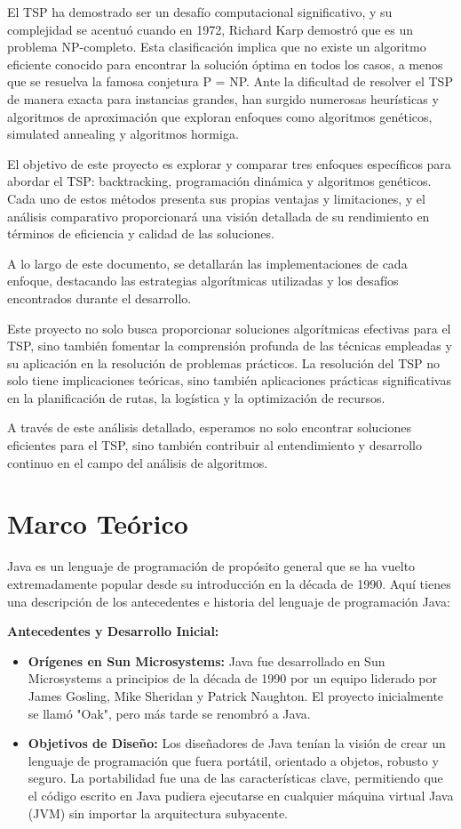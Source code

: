 \documentclass{article}
\begin{document}
	El TSP ha demostrado ser un desafío computacional significativo, y su complejidad se acentuó cuando en 1972, Richard Karp demostró que es un problema NP-completo. Esta clasificación implica que no existe un algoritmo eficiente conocido para encontrar la solución óptima en todos los casos, a menos que se resuelva la famosa conjetura P = NP. Ante la dificultad de resolver el TSP de manera exacta para instancias grandes, han surgido numerosas heurísticas y algoritmos de aproximación que exploran enfoques como algoritmos genéticos, simulated annealing y algoritmos hormiga.
	
	El objetivo de este proyecto es explorar y comparar tres enfoques específicos para abordar el TSP: backtracking, programación dinámica y algoritmos genéticos. Cada uno de estos métodos presenta sus propias ventajas y limitaciones, y el análisis comparativo proporcionará una visión detallada de su rendimiento en términos de eficiencia y calidad de las soluciones.
	
	A lo largo de este documento, se detallarán las implementaciones de cada enfoque, destacando las estrategias algorítmicas utilizadas y los desafíos encontrados durante el desarrollo. 
	
	Este proyecto no solo busca proporcionar soluciones algorítmicas efectivas para el TSP, sino también fomentar la comprensión profunda de las técnicas empleadas y su aplicación en la resolución de problemas prácticos. La resolución del TSP no solo tiene implicaciones teóricas, sino también aplicaciones prácticas significativas en la planificación de rutas, la logística y la optimización de recursos.
	
	A través de este análisis detallado, esperamos no solo encontrar soluciones eficientes para el TSP, sino también contribuir al entendimiento y desarrollo continuo en el campo del análisis de algoritmos.
	
	\section{Marco Teórico}
	Java es un lenguaje de programación de propósito general que se ha vuelto extremadamente popular desde su introducción en la década de 1990. Aquí tienes una descripción de los antecedentes e historia del lenguaje de programación Java:
	
	\textbf{Antecedentes y Desarrollo Inicial:}
	\begin{itemize}
		\item \textbf{Orígenes en Sun Microsystems:} Java fue desarrollado en Sun Microsystems a principios de la década de 1990 por un equipo liderado por James Gosling, Mike Sheridan y Patrick Naughton. El proyecto inicialmente se llamó "Oak", pero más tarde se renombró a Java.
		
		\item \textbf{Objetivos de Diseño:} Los diseñadores de Java tenían la visión de crear un lenguaje de programación que fuera portátil, orientado a objetos, robusto y seguro. La portabilidad fue una de las características clave, permitiendo que el código escrito en Java pudiera ejecutarse en cualquier máquina virtual Java (JVM) sin importar la arquitectura subyacente.
	\end{itemize}
	
\end{document}
